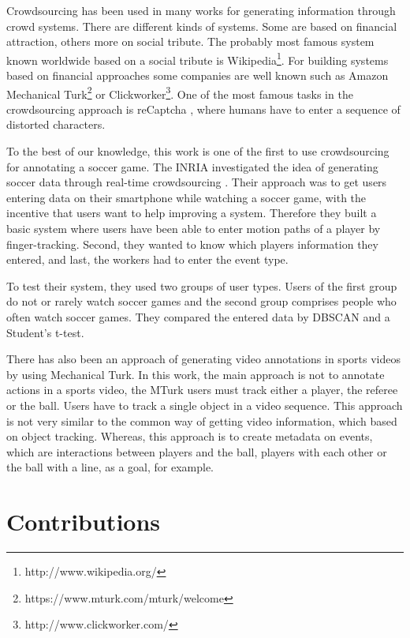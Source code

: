 Crowdsourcing has been used in many works for generating information through crowd systems. There are different kinds of systems. Some are based on financial attraction, others more on social tribute. 
The probably most famous system known worldwide based on a social tribute is Wikipedia\footnote{http://www.wikipedia.org/}. For building systems based on financial approaches some companies are well known such as Amazon Mechanical Turk\footnote{https://www.mturk.com/mturk/welcome} or Clickworker\footnote{http://www.clickworker.com/}. One of the most famous tasks in the crowdsourcing approach is reCaptcha \cite{Ahn:2008}, where humans have to enter a sequence of distorted characters.
\newline

To the best of our knowledge, this work is one of the first to use crowdsourcing for annotating a soccer game.
The INRIA investigated the idea of generating soccer data through real-time crowdsourcing \cite{Perin:2013}.
Their approach was to get users entering data on their smartphone while watching a soccer game, with the incentive that users want to help improving a system. Therefore they built a basic system where users have been able to enter motion paths of a player by finger-tracking. Second, they wanted to know which players information they entered, and last, the workers had to enter the event type.

To test their system, they used two groups of user types. Users of the first group do not or rarely watch soccer games and the second group comprises people who often watch soccer games.
They compared the entered data by DBSCAN \cite{ester:1996} and a Student's t-test.
\newline

There has also been an approach of generating video annotations in sports videos by using Mechanical Turk\cite{Vondrick:2010}. In this work, the main approach is not to annotate actions in a sports video, the MTurk users must track either a player, the referee or the ball. Users have to track a single object in a video sequence.
This approach is not very similar to the common way of getting video information, which based on object tracking. Whereas, this approach is to create metadata on events, which are interactions between players and the ball, players with each other or the ball with a line, as a goal, for example.
\newline

\section{Contributions}

